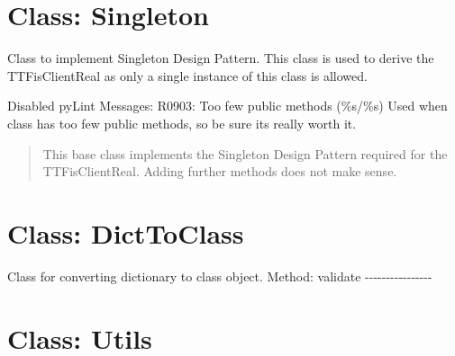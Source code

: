 %
%

\hypertarget{qconnectbase-utils-class-singleton-77}{%
\section{Class: Singleton}\label{qconnectbase-utils-class-singleton-77}}

\begin{Shaded}
\begin{Highlighting}[]
\end{Highlighting}
\end{Shaded}

Class to implement Singleton Design Pattern. This class is used to
derive the TTFisClientReal as only a single instance of this class is
allowed.

Disabled pyLint Messages: R0903: Too few public methods (\%s/\%s) Used
when class has too few public methods, so be sure it\textquotesingle s
really worth it.

\begin{quote}
This base class implements the Singleton Design Pattern required for the
TTFisClientReal. Adding further methods does not make sense.
\end{quote}

\hypertarget{qconnectbase-utils-class-dicttoclass-78}{%
\section{Class: DictToClass}\label{qconnectbase-utils-class-dicttoclass-78}}

\begin{Shaded}
\begin{Highlighting}[]
\end{Highlighting}
\end{Shaded}

Class for converting dictionary to class object. Method: validate
-\/-\/-\/-\/-\/-\/-\/-\/-\/-\/-\/-\/-\/-\/-\/-

\hypertarget{qconnectbase-utils-class-utils-79}{%
\section{Class: Utils}\label{qconnectbase-utils-class-utils-79}}

\begin{Shaded}
\begin{Highlighting}[]
\end{Highlighting}
\end{Shaded}

